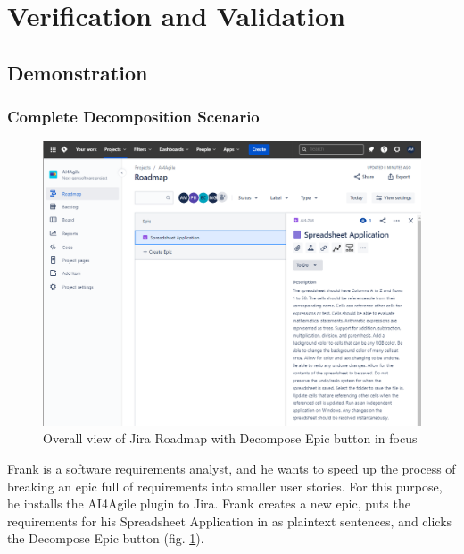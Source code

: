 \section{Verification and Validation}

\subsection{Demonstration}

\subsubsection{Complete Decomposition Scenario}
\label{Scenario1}

\begin{figure}
\centerline{\includegraphics[width=\textwidth,height=\textheight,keepaspectratio]{./figure/Scenario1Figure1.png}}
\caption{Overall view of Jira Roadmap with Decompose Epic button in focus}
\label{fig:Scenario1Figure1}
\end{figure}

Frank is a software requirements analyst, and he wants to speed up the process of breaking an epic full of requirements into smaller user stories. For this purpose, he installs the AI4Agile plugin to Jira. Frank creates a new epic, puts the requirements for his Spreadsheet Application in as plaintext sentences, and clicks the Decompose Epic button (fig. \ref{fig:Scenario1Figure1}).

